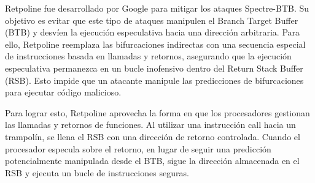 \documentclass[lettersize,compsoc]{IEEEtran}
\begin{document}
Retpoline fue desarrollado por Google para mitigar los ataques Spectre-BTB. Su objetivo es evitar que este tipo de ataques manipulen el Branch Target Buffer (BTB) y desvíen la ejecución especulativa hacia una dirección arbitraria. Para ello, Retpoline reemplaza las bifurcaciones indirectas con una secuencia especial de instrucciones basada en llamadas y retornos, asegurando que la ejecución especulativa permanezca en un bucle inofensivo dentro del Return Stack Buffer (RSB). Esto impide que un atacante manipule las predicciones de bifurcaciones para ejecutar código malicioso.

Para lograr esto, Retpoline aprovecha la forma en que los procesadores gestionan las llamadas y retornos de funciones. Al utilizar una instrucción call hacia un trampolín, se llena el RSB con una dirección de retorno controlada. Cuando el procesador especula sobre el retorno, en lugar de seguir una predicción potencialmente manipulada desde el BTB, sigue la dirección almacenada en el RSB y ejecuta un bucle de instrucciones seguras.\cite{retpoline1}\cite{retpoline2}
\end{document}
